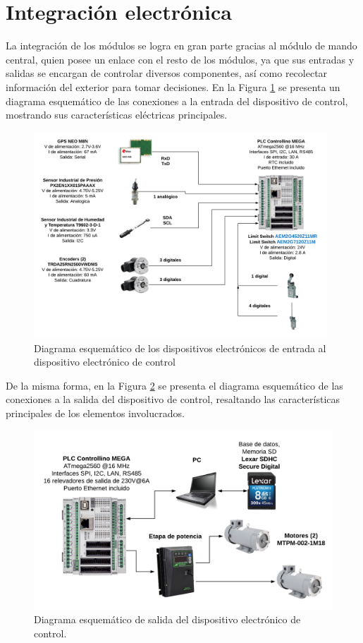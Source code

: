 \section{Integración electrónica}
La integración de los módulos se logra en gran parte gracias al módulo de mando central, quien posee un enlace con el resto de los módulos, ya que sus entradas y salidas se encargan de controlar diversos componentes, así como recolectar información del exterior para tomar decisiones.
En la Figura \ref{fig:MC_entrada} se presenta un diagrama esquemático de las conexiones a la entrada del dispositivo de control, mostrando sus características eléctricas principales.
	\begin{figure}[H]
		\centering
		\includegraphics[width=11cm]{imagenes/MC_entrada}
		\caption{Diagrama esquemático de los dispositivos electrónicos de entrada al dispositivo electrónico de control}
		\label{fig:MC_entrada}
	\end{figure}

De la misma forma, en la Figura \ref{fig:MC_salida} se presenta el diagrama esquemático de las conexiones a la salida del dispositivo de control, resaltando las características principales de los elementos involucrados.
\begin{figure}[H]
	\centering
	\includegraphics[width=\columnwidth]{imagenes/MC_salida}
	\caption{Diagrama esquemático de salida del dispositivo electrónico de control.}
	\label{fig:MC_salida}
\end{figure}

